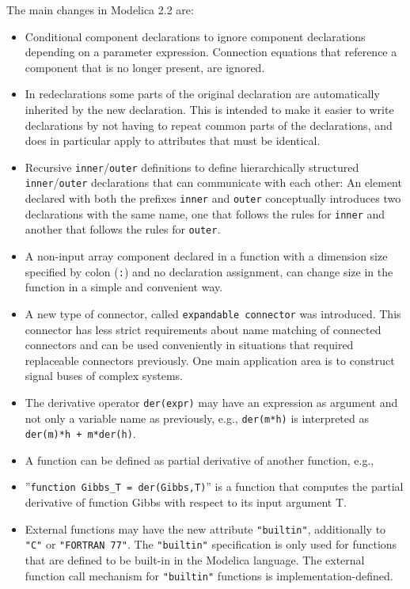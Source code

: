 The main changes in Modelica 2.2 are:
\begin{itemize}
\item
  Conditional component declarations to ignore component declarations
  depending on a parameter expression. Connection equations that
  reference a component that is no longer present, are ignored.
\item
  In redeclarations some parts of the original declaration are
  automatically inherited by the new declaration. This is intended to
  make it easier to write declarations by not having to repeat common
  parts of the declarations, and does in particular apply to attributes
  that must be identical.
\item
  Recursive \lstinline!inner!/\lstinline!outer! definitions to define hierarchically structured
  \lstinline!inner!/\lstinline!outer! declarations that can communicate with each other: An
  element declared with both the prefixes \lstinline!inner! and \lstinline!outer! conceptually
  introduces two declarations with the same name, one that follows the
  rules for \lstinline!inner! and another that follows the rules for \lstinline!outer!.
\item
  A non-input array component declared in a function with a dimension size specified by colon (\lstinline!:!) and no declaration assignment, can change size in the function in a simple and convenient way.
\item
  A new type of connector, called \lstinline!expandable connector! was
  introduced. This connector has less strict requirements about name
  matching of connected connectors and can be used conveniently in
  situations that required replaceable connectors previously. One main
  application area is to construct signal buses of complex systems.
\item
  The derivative operator \lstinline!der(expr)! may have an expression as argument
  and not only a variable name as previously, e.g., \lstinline!der(m*h)! is
  interpreted as \lstinline!der(m)*h + m*der(h)!.
\item
  A function can be defined as partial derivative of another function,
  e.g.,
\item
  ''\lstinline!function Gibbs_T = der(Gibbs,T)!'' is a function that computes the
  partial derivative of function Gibbs with respect to its input
  argument T.
\item
  External functions may have the new attribute \lstinline!"builtin"!, additionally to \lstinline!"C"! or \lstinline!"FORTRAN 77"!.  The \lstinline!"builtin"! specification is only used for functions that are defined to be built-in in the Modelica language.  The external function call mechanism for \lstinline!"builtin"! functions is implementation-defined.
\end{itemize}

